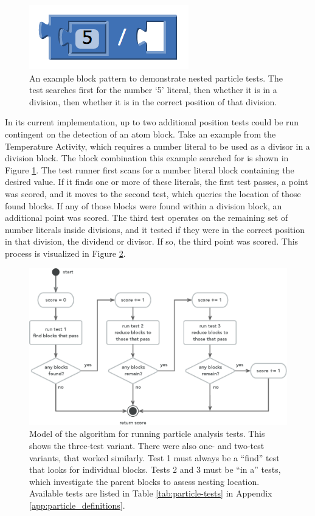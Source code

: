 \begin{figure}
  \centering
      \includegraphics{images/ch4-particle-example-5div}
  \caption[Example blocks to demonstrate nested particle tests]{An example block pattern to demonstrate nested particle tests. The test searches first for the number `5' literal, then whether it is in a division, then whether it is in the correct position of that division.}
  \label{fig:particle-example-5div}
\end{figure}
In its current implementation, up to two additional position tests could be run contingent on the detection of an atom block. Take an example from the Temperature Activity, which requires a number literal to be used as a divisor in a division block. The block combination this example searched for is shown in Figure \ref{fig:particle-example-5div}. The test runner first scans for a number literal block containing the desired value. If it finds one or more of these literals, the first test passes, a point was scored, and it moves to the second test, which queries the location of those found blocks. If any of those blocks were found within a division block, an additional point was scored. The third test operates on the remaining set of number literals inside divisions, and it tested if they were in the correct position in that division, the dividend or divisor. If so, the third point was scored. This process is visualized in Figure \ref{fig:particle-run3}.

\begin{figure}
  \centering
      \includegraphics[width=\textwidth]{diagrams/particle-run3}
  \caption[Particle analysis test running algorithm]{Model of the algorithm for running particle analysis tests. This shows the three-test variant. There were also one- and two-test variants, that worked similarly. Test 1 must always be a ``find'' test that looks for individual blocks. Tests 2 and 3 must be ``in a'' tests, which investigate the parent blocks to assess nesting location. Available tests are listed in Table \ref{tab:particle-tests} in Appendix \ref{app:particle_definitions}.}
  \label{fig:particle-run3}
\end{figure}

